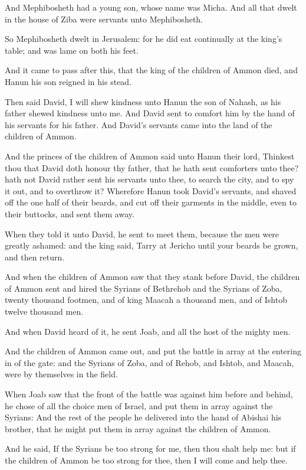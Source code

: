 \Verse And Mephibosheth had a young son, whose name was Micha. And all that dwelt in the house of Ziba were servants unto Mephibosheth.

\Verse So Mephibosheth dwelt in Jerusalem: for he did eat continually at the king's table; and was lame on both his feet.


\Chapter
\Verse And it came to pass after this, that the king of the children of Ammon died, and Hanun his son reigned in his stead.

\Verse Then said David, I will shew kindness unto Hanun the son of Nahash, as his father shewed kindness unto me. And David sent to comfort him by the hand of his servants for his father. And David's servants came into the land of the children of Ammon.

\Verse And the princes of the children of Ammon said unto Hanun their lord, Thinkest thou that David doth honour thy father, that he hath sent comforters unto thee? hath not David rather sent his servants unto thee, to search the city, and to spy it out, and to overthrow it?  \Verse Wherefore Hanun took David's servants, and shaved off the one half of their beards, and cut off their garments in the middle, even to their buttocks, and sent them away.

\Verse When they told it unto David, he sent to meet them, because the men were greatly ashamed: and the king said, Tarry at Jericho until your beards be grown, and then return.

\Verse And when the children of Ammon saw that they stank before David, the children of Ammon sent and hired the Syrians of Bethrehob and the Syrians of Zoba, twenty thousand footmen, and of king Maacah a thousand men, and of Ishtob twelve thousand men.

\Verse And when David heard of it, he sent Joab, and all the host of the mighty men.

\Verse And the children of Ammon came out, and put the battle in array at the entering in of the gate: and the Syrians of Zoba, and of Rehob, and Ishtob, and Maacah, were by themselves in the field.

\Verse When Joab saw that the front of the battle was against him before and behind, he chose of all the choice men of Israel, and put them in array against the Syrians: \Verse And the rest of the people he delivered into the hand of Abishai his brother, that he might put them in array against the children of Ammon.

\Verse And he said, If the Syrians be too strong for me, then thou shalt help me: but if the children of Ammon be too strong for thee, then I will come and help thee.

